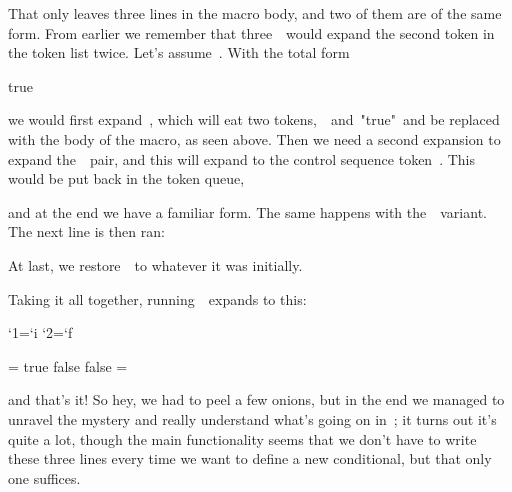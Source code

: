 {{{That only leaves three lines in the macro body, and two of them are of
the same form. From earlier we remember that
three~\type{\expandafter}~would expand the second token in the token
list twice. Let's assume~. With the total form

\starttyping
\expandafter\expandafter\expandafter {} {\let \ifred = \iftrue}
\stoptyping

we would first expand~\type{\@if}, which will eat two
tokens,~~and~\type"{true}"~and be replaced with the body of the
macro, as seen above. Then we need a second expansion to expand
the~~pair, and this will expand to the control sequence
token~. This would be put back in the token queue,

\starttyping
\expandafter \def \csname \expandafter\if@\string{}\endcsname{\let \ifred = \iftrue}
\def \redtrue{\let \ifred = \iftrue}
\stoptyping

and at the end we have a familiar form. The same happens with
the~~variant. The next line is then ran:

\starttyping
\@if{} %
\csname \expandafter\if@\string{}\endcsname  %
\redfalse  %
\let\ifred=\iffalse  %
\stoptyping

At last, we restore~\type{\escapechar}~to whatever it was initially.

\stopsectionlevel

\stopsectionlevel

\startsectionlevel[title={In Conclusion},reference={in-conclusion}]

Taking it all together, running~\type{\newif\ifred}~expands to this:

\starttyping
\def\@if#1#2{\csname\expandafter\if@\string#1#2\endcsname}
{\uccode`1=`i \uccode`2=`f \uppercase{\gdef\if@12{}}} %

\newif\ifred
\count@=\escapechar
{}
\expandafter\expandafter\expandafter \def\@if\ifred{true}{\let\ifred=\iftrue}
\expandafter\expandafter\expandafter \def\@if\ifred{false}{\let\ifred=\iffalse}
\@if\ifred{false}
\escapechar=\count@
\def\redtrue{\let\ifred=\iftrue}
\def\redfalse{\let\ifred=\iffalse}
\redfalse
\stoptyping

and that's it! So hey, we had to peel a few
onions,
but in the end we managed to unravel the mystery and really understand
what's going on in~\type{\newif}; it turns out it's quite a lot, though
the main functionality seems that we don't have to write these three
lines every time we want to define a new conditional, but that only one
suffices.

}}}
